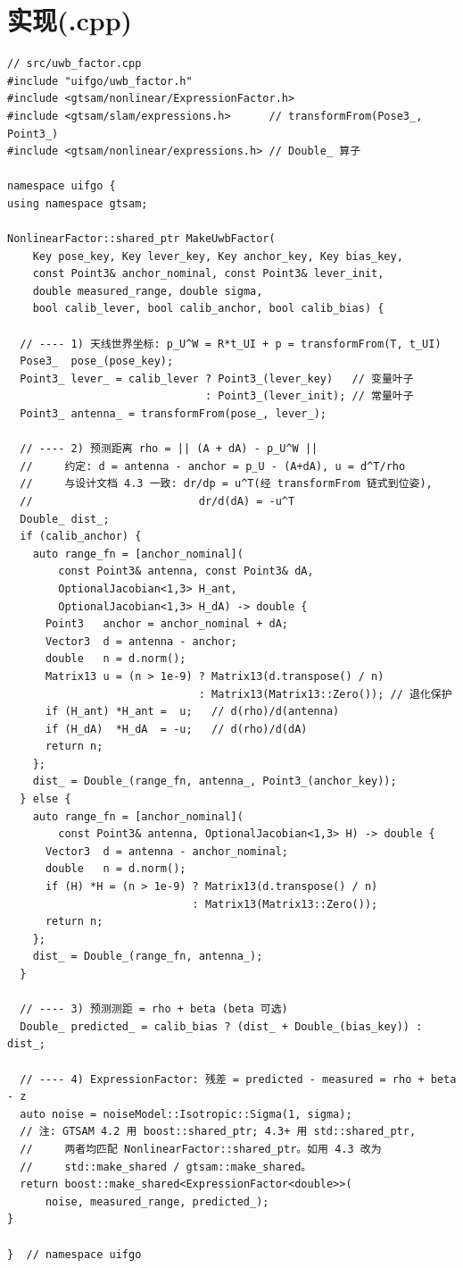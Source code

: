 \documentclass[11pt,a4paper]{report}
\begin{document}
\section{实现(.cpp)}
\begin{lstlisting}[style=cpp]
// src/uwb_factor.cpp
#include "uifgo/uwb_factor.h"
#include <gtsam/nonlinear/ExpressionFactor.h>
#include <gtsam/slam/expressions.h>      // transformFrom(Pose3_, Point3_)
#include <gtsam/nonlinear/expressions.h> // Double_ 算子

namespace uifgo {
using namespace gtsam;

NonlinearFactor::shared_ptr MakeUwbFactor(
    Key pose_key, Key lever_key, Key anchor_key, Key bias_key,
    const Point3& anchor_nominal, const Point3& lever_init,
    double measured_range, double sigma,
    bool calib_lever, bool calib_anchor, bool calib_bias) {

  // ---- 1) 天线世界坐标: p_U^W = R*t_UI + p = transformFrom(T, t_UI)
  Pose3_  pose_(pose_key);
  Point3_ lever_ = calib_lever ? Point3_(lever_key)   // 变量叶子
                               : Point3_(lever_init); // 常量叶子
  Point3_ antenna_ = transformFrom(pose_, lever_);

  // ---- 2) 预测距离 rho = || (A + dA) - p_U^W ||
  //     约定: d = antenna - anchor = p_U - (A+dA), u = d^T/rho
  //     与设计文档 4.3 一致: dr/dp = u^T(经 transformFrom 链式到位姿),
  //                          dr/d(dA) = -u^T
  Double_ dist_;
  if (calib_anchor) {
    auto range_fn = [anchor_nominal](
        const Point3& antenna, const Point3& dA,
        OptionalJacobian<1,3> H_ant,
        OptionalJacobian<1,3> H_dA) -> double {
      Point3   anchor = anchor_nominal + dA;
      Vector3  d = antenna - anchor;
      double   n = d.norm();
      Matrix13 u = (n > 1e-9) ? Matrix13(d.transpose() / n)
                              : Matrix13(Matrix13::Zero()); // 退化保护
      if (H_ant) *H_ant =  u;   // d(rho)/d(antenna)
      if (H_dA)  *H_dA  = -u;   // d(rho)/d(dA)
      return n;
    };
    dist_ = Double_(range_fn, antenna_, Point3_(anchor_key));
  } else {
    auto range_fn = [anchor_nominal](
        const Point3& antenna, OptionalJacobian<1,3> H) -> double {
      Vector3  d = antenna - anchor_nominal;
      double   n = d.norm();
      if (H) *H = (n > 1e-9) ? Matrix13(d.transpose() / n)
                             : Matrix13(Matrix13::Zero());
      return n;
    };
    dist_ = Double_(range_fn, antenna_);
  }

  // ---- 3) 预测测距 = rho + beta (beta 可选)
  Double_ predicted_ = calib_bias ? (dist_ + Double_(bias_key)) : dist_;

  // ---- 4) ExpressionFactor: 残差 = predicted - measured = rho + beta - z
  auto noise = noiseModel::Isotropic::Sigma(1, sigma);
  // 注: GTSAM 4.2 用 boost::shared_ptr; 4.3+ 用 std::shared_ptr,
  //     两者均匹配 NonlinearFactor::shared_ptr。如用 4.3 改为
  //     std::make_shared / gtsam::make_shared。
  return boost::make_shared<ExpressionFactor<double>>(
      noise, measured_range, predicted_);
}

}  // namespace uifgo
\end{lstlisting}
\end{document}
